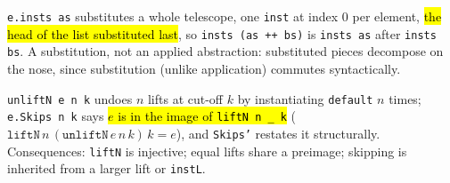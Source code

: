 \begin{definition}
\label{def:insts}
\leanok
{}

 \texttt{e.insts as} substitutes a whole telescope, one \texttt{inst} at
index $0$ per element, \hl{the head of the list substituted last}, so
\texttt{insts (as ++ bs)} is \texttt{insts as} after \texttt{insts bs}.
 A substitution, not an applied abstraction: substituted pieces decompose
on the nose, since substitution (unlike application) commutes syntactically.
\end{definition}

\begin{definition}
\label{def:unliftn-skips}
\leanok
{}

 \texttt{unliftN e n k} undoes $n$ lifts at cut-off $k$ by instantiating
\texttt{default} $n$ times; \texttt{e.Skips n k} says \hl{$e$ is in the image of
\texttt{liftN n \_ k}} ($\texttt{liftN}\,n\,(\texttt{unliftN}\,e\,n\,k)\,k = e$), and
\texttt{Skips'} restates it structurally.
Consequences: \texttt{liftN} is injective; equal lifts share a preimage; skipping
is inherited from a larger lift or \texttt{instL}.
\end{definition}

